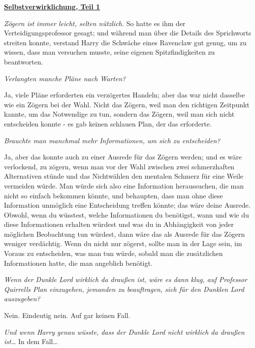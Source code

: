

\hypertarget{selbstverwirklichung-teil-1}{%

\textbf{\uline{Selbstverwirklichung, Teil 1}}

\emph{Zögern ist immer leicht, selten nützlich.} So hatte es ihm der Verteidigungsprofessor gesagt; und während man über die Details des Sprichworts streiten konnte, verstand Harry die Schwäche eines Ravenclaw gut genug, um zu wissen, dass man versuchen musste, seine eigenen Spitzfindigkeiten zu beantworten.

\emph{Verlangten manche Pläne nach Warten?}

Ja, viele Pläne erforderten ein verzögertes Handeln; aber das war nicht dasselbe wie ein Zögern bei der Wahl. Nicht das Zögern, weil man den richtigen Zeitpunkt kannte, um das Notwendige zu tun, sondern das Zögern, weil man sich nicht entscheiden konnte - es gab keinen schlauen Plan, der das erforderte.

\emph{Brauchte man manchmal mehr Informationen, um sich zu entscheiden?}

Ja, aber das konnte auch zu einer Ausrede für das Zögern werden; und es wäre verlockend, zu zögern, wenn man vor der Wahl zwischen zwei schmerzhaften Alternativen stünde und das Nichtwählen den mentalen Schmerz für eine Weile vermeiden würde. Man würde sich also eine Information heraussuchen, die man nicht so einfach bekommen könnte, und behaupten, dass man ohne diese Information unmöglich eine Entscheidung treffen könnte; das wäre deine Ausrede. Obwohl, wenn du wüsstest, welche Informationen du benötigst, wann und wie du diese Informationen erhalten würdest und was du in Abhängigkeit von jeder möglichen Beobachtung tun würdest, dann wäre das als Ausrede für das Zögern weniger verdächtig. Wenn du nicht nur zögerst, sollte man in der Lage sein, im Voraus zu entscheiden, was man tun würde, sobald man die zusätzlichen Informationen hatte, die man angeblich benötigt.

\emph{Wenn der Dunkle Lord wirklich da draußen ist, wäre es dann klug, auf Professor Quirrells Plan einzugehen, jemanden zu beauftragen, sich für den Dunklen Lord auszugeben?}

Nein. Eindeutig nein. Auf gar keinen Fall.

\emph{Und wenn Harry genau wüsste, dass der Dunkle Lord nicht wirklich da draußen ist…} In dem Fall…

}
